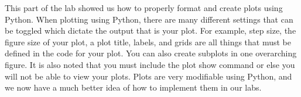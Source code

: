 This part of the lab showed us how to properly format and create plots using Python. When plotting using Python, there are many different settings that can be toggled which dictate the output that is your plot. For example, step size, the figure size of your plot, a plot title, labels, and grids are all things that must be defined in the code for your plot. You can also create subplots in one overarching figure. It is also noted that you must include the plot show command or else you will not be able to view your plots. Plots are very modifiable using Python, and we now have a much better idea of how to implement them in our labs.